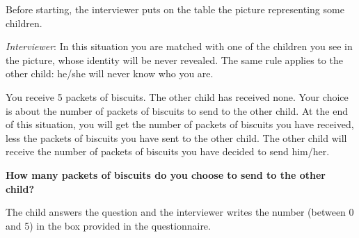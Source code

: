 \documentclass[authoryear, preprint, review, 12pt]{elsarticle}
\begin{document}
Before starting, the interviewer puts on the table the picture representing some children. 

\textit{Interviewer}: 
In this situation you are matched with one of the children you see in the picture, whose identity will be never revealed. The same rule applies to the other child: he/she will never know who you are.

You receive 5 packets of biscuits. The other child has received none. Your choice is about the number of packets of biscuits to send to the other child. At the end of this situation, you will get the number of packets of biscuits you have received, less the packets of biscuits you have sent to the other child. The other child will receive the number of packets of biscuits you have decided to send him/her.

\textbf{How many packets of biscuits do you choose to send to the other child?}

The child answers the question and the interviewer writes the number (between 0 and 5) in the box provided in the questionnaire.

\clearpage
\end{document}
